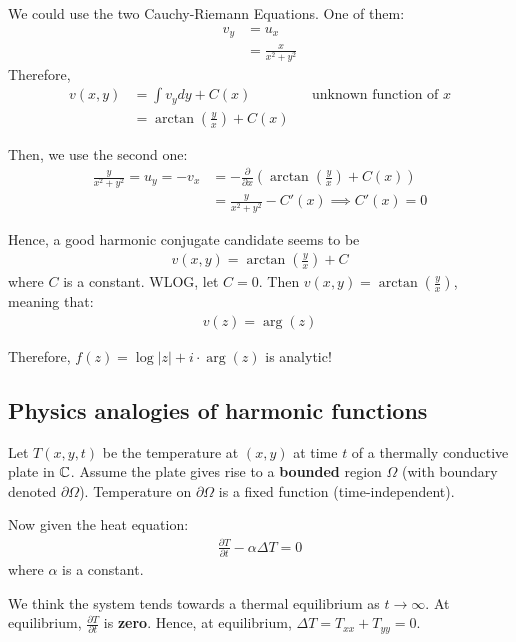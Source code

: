 \documentclass[12pt]{article}
\begin{document}
We could use the two Cauchy-Riemann Equations. One of them:
\begin{align*}
    v_y&=u_x\\
    &= \frac{x}{x^2+y^2}
\end{align*}
Therefore, \begin{align*}
    v(x,y) &= \int v_ydy + C(x) && \text{unknown function of }x\\
    &= \arctan\left(\frac{y}{x}\right)+C(x)
\end{align*}

Then, we use the second one: \begin{align*}
    \frac{y}{x^2+y^2}=u_y=-v_x &= -\frac{\partial}{\partial x} \left( \arctan\left(\frac{y}{x}\right)+C(x)\right)\\
    &= \frac{y}{x^2+y^2}-C'(x) \implies C'(x)=0
\end{align*}

Hence, a good harmonic conjugate candidate seems to be \begin{align*}
    v(x,y) = \arctan\left(\frac{y}{x}\right) + C
\end{align*}
where $C$ is a constant. WLOG, let $C=0$. Then $ v(x,y)=\arctan\left(\frac{y}{x}\right)$, meaning that: \begin{align*}
    v(z)=\arg (z)
\end{align*}

Therefore, $f(z)=\log |z| + i\cdot \arg(z)$ is analytic!

\subsection{Physics analogies of harmonic functions}
\eg Let $T(x,y,t)$ be the temperature at $(x,y)$ at time $t$ of a thermally conductive plate in $\mathbb{C}$. Assume the plate gives rise to a \textbf{bounded} region $\Omega$ (with boundary denoted $\partial \Omega$). Temperature on $\partial \Omega$ is a fixed function (time-independent).

\begin{figure}[H]
    \centering
    
\end{figure}

Now given the heat equation: \begin{align*}
    \frac{\partial T}{\partial t}-\alpha \Delta T=0
\end{align*}
where $\alpha$ is a constant.

We think the system tends towards a thermal equilibrium as $t\to \infty$. At equilibrium, $\frac{\partial T}{\partial t}$ is \textbf{zero}. Hence, at equilibrium, $\Delta T=T_{xx}+T_{yy}=0$.
\end{document}
